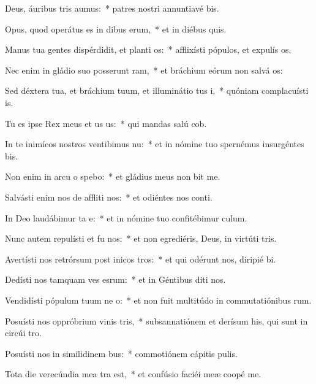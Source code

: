 \item Deus, áuribus tris aumus:~* patres nostri annuntiavé bis.
\item Opus, quod operátus es in dibus erum,~* et in diébus quis.
\item Manus tua gentes dispérdidit, et planti os:~* afflixísti pópulos, et expulís os.
\item Nec enim in gládio suo posserunt ram,~* et bráchium eórum non salvá os:
\item Sed déxtera tua, et bráchium tuum, et illuminátio tus i,~* quóniam complacuísti  is.
\item Tu es ipse Rex meus et us us:~* qui mandas salú cob.
\item In te inimícos nostros ventibimus nu:~* et in nómine tuo spernémus insurgéntes  bis.
\item Non enim in arcu o spebo:~* et gládius meus non bit me.
\item Salvásti enim nos de affliti nos:~* et odiéntes nos conti.
\item In Deo laudábimur ta e:~* et in nómine tuo confitébimur  culum.
\item Nunc autem repulísti et fu nos:~* et non egrediéris, Deus, in virtúti tris.
\item Avertísti nos retrórsum post inicos tros:~* et qui odérunt nos, diripié bi.
\item Dedísti nos tamquam ves esrum:~* et in Géntibus diti nos.
\item Vendidísti pópulum tuum ne o:~* et non fuit multitúdo in commutatiónibus rum.
\item Posuísti nos oppróbrium vinis tris,~* subsannatiónem et derísum his, qui sunt in circúi tro.
\item Posuísti nos in similidinem bus:~* commotiónem cápitis  pulis.
\item Tota die verecúndia mea tra  est,~* et confúsio faciéi meæ coopé me.
